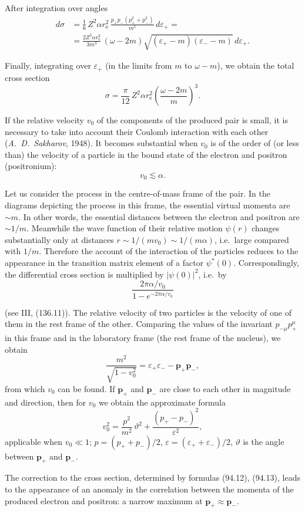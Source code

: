 After integration over angles
\begin{equation}
\begin{split}
d\sigma &= \frac{1}{6}\,Z^2\alpha r_\mathrm{e}^2\,\frac{p_+p_-(p_+^2 + p_-^2)}{m^5}\,d\varepsilon_+ = {} \\
&= \frac{2Z^2\alpha r_\mathrm{e}^2}{3m^3}\,(\omega - 2m)\sqrt{(\varepsilon_+ - m)(\varepsilon_- - m)}\,d\varepsilon_+.
\end{split}
\label{eq:94.9}
\end{equation}

Finally, integrating over $\varepsilon_+$ (in the limits from $m$ to $\omega - m$), we obtain the total cross section
\begin{equation}
\sigma = \frac{\pi}{12}\,Z^2\alpha r_\mathrm{e}^2\!\left(\frac{\omega - 2m}{m}\right)^{\!3}.
\label{eq:94.10}
\end{equation}

If the relative velocity $v_0$ of the components of the produced pair is small, it is necessary to take into account their Coulomb interaction with each other (\emph{A.~D.~Sakharov}, 1948). It becomes substantial when $v_0$ is of the order of (or less than) the velocity of a particle in the bound state of the electron and positron (positronium):
\begin{equation}
v_0 \lesssim \alpha.
\label{eq:94.11}
\end{equation}

Let us consider the process in the centre-of-mass frame of the pair. In the diagrams depicting the process in this frame, the essential virtual momenta are $\sim m$. In other words, the essential distances between the electron and positron are $\sim 1/m$. Meanwhile the wave function of their relative motion $\psi(r)$ changes substantially only at distances $r \sim 1/(mv_0) \sim 1/(m\alpha)$, i.e.\ large compared with $1/m$. Therefore the account of the interaction of the particles reduces to the appearance in the transition matrix element of a factor $\psi^*(0)$. Correspondingly, the differential cross section is multiplied by $|\psi(0)|^2$, i.e.\ by
\begin{equation}
\frac{2\pi\alpha/v_0}{1 - e^{-2\pi\alpha/v_0}}
\label{eq:94.12}
\end{equation}


(see III, (136.11)). The relative velocity of two particles is the velocity of one of them in the rest frame of the other. Comparing the values of the invariant $p_{-\mu}p_+^\mu$ in this frame and in the laboratory frame (the rest frame of the nucleus), we obtain
\[
\frac{m^2}{\sqrt{1 - v_0^2}} = \varepsilon_+\varepsilon_- - \mathbf{p}_+\mathbf{p}_-,
\]
from which $v_0$ can be found. If $\mathbf{p}_+$ and $\mathbf{p}_-$ are close to each other in magnitude and direction, then for $v_0$ we obtain the approximate formula
\begin{equation}
v_0^2 = \frac{p^2}{m^2}\,\vartheta^2 + \frac{(p_+ - p_-)^2}{\varepsilon^2},
\label{eq:94.13}
\end{equation}
applicable when $v_0 \ll 1$; $p = (p_+ + p_-)/2$, $\varepsilon = (\varepsilon_+ + \varepsilon_-)/2$, $\vartheta$ is the angle between $\mathbf{p}_+$ and $\mathbf{p}_-$.

The correction to the cross section, determined by formulas (94.12), (94.13), leads to the appearance of an anomaly in the correlation between the momenta of the produced electron and positron: a narrow maximum at $\mathbf{p}_+ \approx \mathbf{p}_-$.
